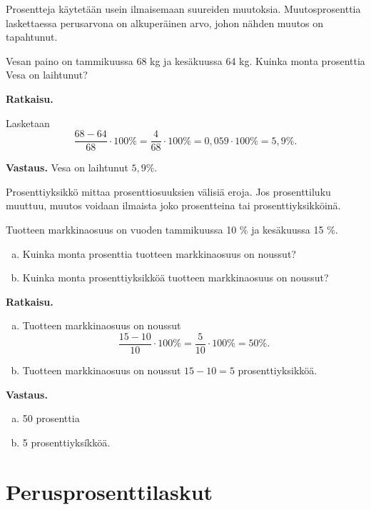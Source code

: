 Prosentteja käytetään usein ilmaisemaan suureiden muutoksia. Muutosprosenttia laskettaessa perusarvona on alkuperäinen arvo, johon nähden muutos on tapahtunut.

\begin{esimerkki}
    Vesan paino on tammikuussa 68 kg ja kesäkuussa 64 kg. Kuinka monta prosenttia Vesa on laihtunut?

    {\bf Ratkaisu.}

    Lasketaan 
    \[
    \frac{68-64}{68}\cdot 100\% = \frac{4}{68} \cdot 100\%=0,059\cdot 100\% =5,9\%.
    \]
    
    {\bf Vastaus.}
    Vesa on laihtunut $5,9\%$.
\end{esimerkki}


Prosenttiyksikkö mittaa prosenttiosuuksien välisiä eroja. Jos prosenttiluku muuttuu, muutos voidaan ilmaista joko prosentteina tai prosenttiyksikköinä.


\begin{esimerkki}
    Tuotteen markkinaosuus on vuoden tammikuussa 10 \% ja kesäkuussa 15 \%. 
    \begin{enumerate}[a)]
    \item Kuinka monta prosenttia tuotteen markkinaosuus on noussut?
    
    \item Kuinka monta prosenttiyksikköä tuotteen markkinaosuus on noussut?
    \end{enumerate}
    
    {\bf Ratkaisu.} 
    
    \begin{enumerate}[a)]
    \item Tuotteen markkinaosuus on noussut
    \[
    \frac{15-10}{10} \cdot 100 \%= \frac{5}{10}\cdot 100\% = 50\%.
    \]
    
    \item Tuotteen markkinaosuus on noussut $15-10=5$ prosenttiyksikköä. 
    \end{enumerate}
    
    {\bf Vastaus.}
    
    \begin{enumerate}[a)]
    \item 50 prosenttia
    \item 5 prosenttiyksíkköä.
    \end{enumerate}
\end{esimerkki}




\section{Perusprosenttilaskut}

